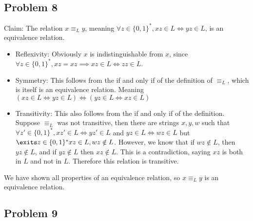 \documentclass[english]{article}
\begin{document}
\subsection*{Problem 8}
Claim: The relation $x \equiv_L y$, meaning $\forall z \in \{0,1\}^*, xz \in L \iff yz \in L$, is an equivalence relation.
\begin{itemize}
\item Reflexivity: Obviously $x$ is indistinguishable from $x$, since $\forall z \in \{0,1\}^*, xz = xz \implies xz \in L \iff zz \in L$.
\item Symmetry: This follows from the if and only if of the definition of $\equiv_L$, which is itself is an equivalence relation. Meaning $(xz \in L \iff yz \in L) \iff (yz \in L \iff xz \in L)$
\item Transitivity: This also follows from the if and only if of the definition. Suppose $\equiv_L$ was not transitive, then there are strings $x,y,w$ such that $\forall z' \in \{0,1\}^*, xz' \in L \iff yz' \in L$ and $yz \in L \iff wz \in L$ but $\exits z \in \{0,1\}^* xz \in L, wz \notin L$. However, we know that if $wz \notin L$, then $yz \notin L$, and if $yz \notin L$ then $xz \notin L$. This is a contradiction, saying $xz$ is both in $L$ and not in $L$. Therefore this relation is transitive.
\end{itemize}

We have shown all properties of an equivalence relation, so $x \equiv_L y$ is an equivalence relation.

\subsection*{Problem 9}
\end{document}
